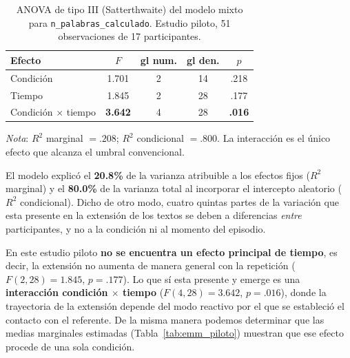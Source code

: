 \documentclass[12pt]{article}
\begin{document}
	\begin{table}[H]
		\centering
		\caption{ANOVA de tipo III (Satterthwaite) del modelo mixto para \texttt{n\_palabras\_calculado}. Estudio piloto, 51 observaciones de 17 participantes.}
		\label{tab:anova_piloto}
		\begin{tabular}{l c c c c}
			\toprule
			Efecto & $F$ & gl num. & gl den. & $p$ \\
			\midrule
			Condición                & 1.701 & 2 & 14 & .218 \\
			Tiempo                   & 1.845 & 2 & 28 & .177 \\
			Condición $\times$ tiempo & \textbf{3.642} & 4 & 28 & \textbf{.016} \\
			\bottomrule
		\end{tabular}
		\par\smallskip
		\noindent\begin{minipage}{\textwidth}
			\footnotesize
			\emph{Nota}: $R^2$ marginal $= .208$; $R^2$ condicional $= .800$. La interacción es el único efecto que alcanza el umbral convencional.
		\end{minipage}
	\end{table}
	
	El modelo explicó el \textbf{20.8\%} de la varianza atribuible a los efectos fijos ($R^2$ marginal) y el \textbf{80.0\%} de la varianza total al incorporar el intercepto aleatorio ($R^2$ condicional). Dicho de otro modo, cuatro quintas partes de la variación que esta presente en la extensión de los textos se deben a diferencias \emph{entre} participantes, y no a la condición ni al momento del episodio.

	En este estudio piloto \textbf{no se encuentra un efecto principal de tiempo}, es decir, la extensión no aumenta de manera general con la repetición ($F(2,28) = 1.845$, $p = .177$). Lo que sí esta presente y emerge es una \textbf{interacción condición $\times$ tiempo} ($F(4,28) = 3.642$, $p = .016$), donde la trayectoria de la extensión depende del modo reactivo por el que se estableció el contacto con el referente. De la misma manera podemos determinar que las medias marginales estimadas (Tabla~\ref{tab:emm_piloto}) muestran que ese efecto procede de una sola condición.
	
\end{document}
